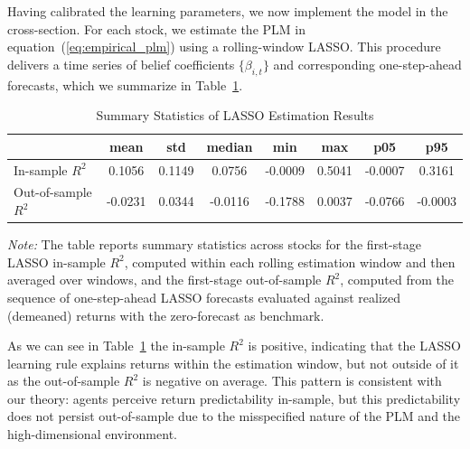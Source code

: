 \documentclass[11pt]{article}
\begin{document}
Having calibrated the learning parameters, we now implement the model in the cross-section.
For each stock, we estimate the PLM in equation~(\ref{eq:empirical_plm}) using a rolling-window LASSO.
This procedure delivers a time series of belief coefficients $\{\beta_{i,t}\}$ and corresponding one-step-ahead forecasts, which we summarize in Table~\ref{tab:summary_stats_lasso}.
\begin{table}[H]
\centering
\caption{Summary Statistics of LASSO Estimation Results}
\label{tab:summary_stats_lasso}
\begin{tabularx}{\textwidth}{@{}>{\small}Xccccccc@{}}
\toprule
 & mean & std & median & min & max & p05 & p95 \\
\midrule
In-sample $R^2$ & 0.1056 & 0.1149 & 0.0756 & -0.0009 & 0.5041 & -0.0007 & 0.3161 \\
Out-of-sample $R^2$ & -0.0231 & 0.0344 & -0.0116 & -0.1788 & 0.0037 & -0.0766 & -0.0003 \\
\bottomrule
\end{tabularx}

\medskip
\begin{minipage}{\textwidth}
\footnotesize
\textit{Note:} The table reports summary statistics across stocks for
the first-stage LASSO in-sample $R^2$, computed within each rolling estimation window and then averaged over windows,
and the first-stage out-of-sample $R^2$, computed from the sequence of one-step-ahead LASSO forecasts evaluated against realized (demeaned) returns with the zero-forecast as benchmark.
\end{minipage}
\end{table}

As we can see in Table~\ref{tab:summary_stats_lasso} the in-sample $R^2$ is positive, indicating that the LASSO learning rule explains returns within the estimation window, but not outside of it as the out-of-sample $R^2$ is negative on average.
This pattern is consistent with our theory: agents perceive return predictability in-sample, but this predictability does not persist out-of-sample due to the misspecified nature of the PLM and the high-dimensional environment.
\end{document}
